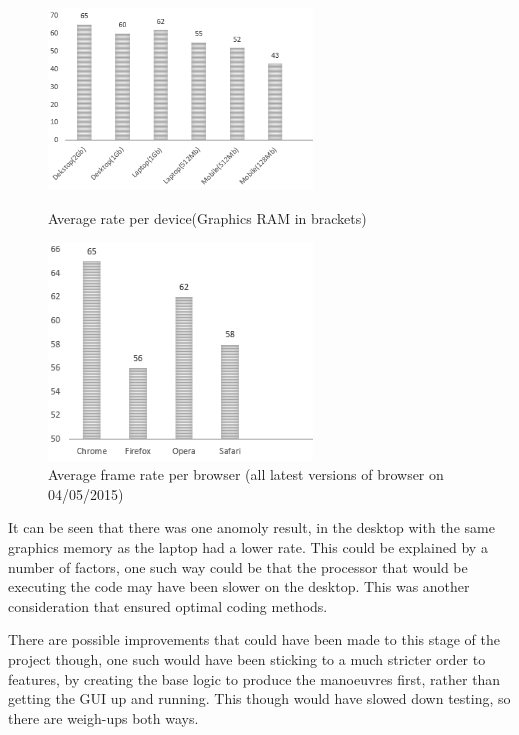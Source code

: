 \begin{figure}[h!]
\centering
\parbox{7cm}{
\includegraphics[width=7cm]{images/fpsMeasured.png}
\caption{Average rate per device(Graphics RAM in brackets)}
\label{fig:framerateDevices}}
\qquad
\begin{minipage}{7cm}
\includegraphics[width=7cm]{images/fpsMeasuredBrowsers.png}
\caption{Average frame rate per browser (all latest versions of browser on 04/05/2015)}
\label{fig:framerateDevicesBrowsers}
\end{minipage}
\end{figure}

It can be seen that there was one anomoly result, in the desktop with the same graphics memory as the laptop had a lower rate. This could be explained by a number of factors, one such way could be that the processor that would be executing the code may have been slower on the desktop. This was another consideration that ensured optimal coding methods.

There are possible improvements that could have been made to this stage of the project though, one such would have been sticking to a much stricter order to features, by creating the base logic to produce the manoeuvres first, rather than getting the GUI up and running. This though would have slowed down testing, so there are weigh-ups both ways.

